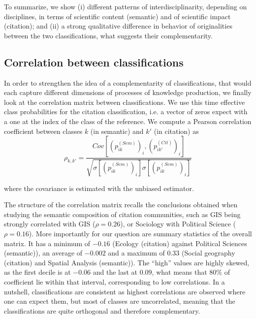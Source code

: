 To summarize, we show (i) different patterns of interdisciplinarity, depending on disciplines, in terms of scientific content (semantic) and of scientific impact (citation); and (ii) a strong qualitative difference in behavior of originalities between the two classifications, what suggests their complementarity.



\subsection*{Correlation between classifications}


In order to strengthen the idea of a complementarity of classifications, that would each capture different dimensions of processes of knowledge production, we finally look at the correlation matrix between classifications. We use this time effective class probabilities for the citation classification, i.e. a vector of zeros expect with a one at the index of the class of the reference. We compute a Pearson correlation coefficient between classes $k$ (in semantic) and $k'$ (in citation) as
\[
\rho_{k,k'} = \frac{Cov \left[ (p^{(Sem)}_{ik})_i , (p^{(Cit)}_{ik'})_i \right]}{\sqrt{\sigma\left[(p^{(Sem)}_{ik})_i\right]\sigma\left[(p^{(Sem)}_{ik})_i\right]}}
\]

\noindent where the covariance is estimated with the unbiased estimator.


The structure of the correlation matrix recalls the conclusions obtained when studying the semantic composition of citation communities, such as GIS being strongly correlated with GIS ($\rho=0.26$), or Sociology with Political Science ($\rho=0.16$). More importantly for our question are summary statistics of the overall matrix. It has a minimum of $-0.16$ (Ecology (citation) against Political Sciences (semantic)), an average of $-0.002$ and a maximum of $0.33$ (Social geography (citation) and Spatial Analysis (semantic)). The ``high'' values are highly skewed, as the first decile is at $-0.06$ and the last at $0.09$, what means that 80\% of coefficient lie within that interval, corresponding to low correlations. In a nutshell, classifications are consistent as highest correlations are observed where one can expect them, but most of classes are uncorrelated, meaning that the classifications are quite orthogonal and therefore complementary.





